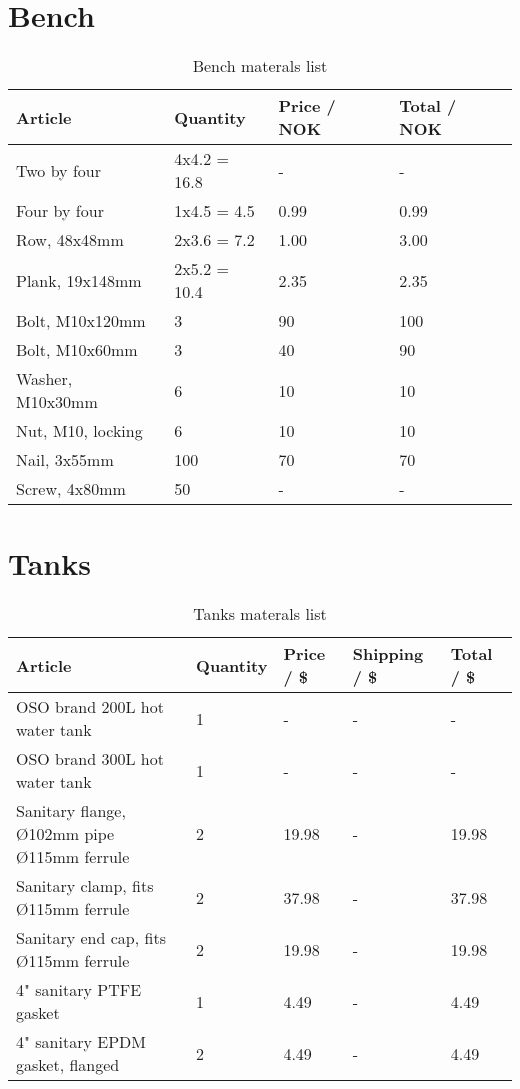 \documentclass[11pt,fleqn,openany]{book} %
\begin{document}
\section{Bench}

\begin{table}[h]
\centering
\begin{tabular}{l l l l}
\toprule
Article & Quantity & Price / NOK & Total / NOK\\
\midrule
Two by four & 4x4.2 = 16.8 & - & - \\
Four by four & 1x4.5 = 4.5 & 0.99 & 0.99 \\
Row, 48x48mm & 2x3.6 = 7.2 & 1.00 & 3.00 \\
Plank, 19x148mm & 2x5.2 = 10.4 & 2.35 & 2.35 \\
Bolt, M10x120mm & 3 & 90 & 100\\
Bolt, M10x60mm & 3 & 40 & 90\\
Washer, M10x30mm & 6 & 10 & 10\\
Nut, M10, locking & 6 & 10 & 10\\
Nail, 3x55mm & 100 & 70 & 70\\
Screw, 4x80mm & 50 & - & -\\
\bottomrule
\end{tabular}
\caption{Bench materals list}
\end{table}

\section{Tanks}

\begin{table}[h]
\centering
\begin{tabular}{l l l l l}
\toprule
Article & Quantity & Price / \$ & Shipping / \$ & Total / \$\\
\midrule
OSO brand 200L hot water tank & 1 & - & - & - \\
OSO brand 300L hot water tank & 1 & - & - & - \\
Sanitary flange, Ø102mm pipe Ø115mm ferrule & 2 & 19.98 & - & 19.98 \\
Sanitary clamp, fits Ø115mm ferrule & 2 & 37.98 & - & 37.98 \\
Sanitary end cap, fits Ø115mm ferrule & 2 & 19.98 & - & 19.98\\
4" sanitary PTFE gasket & 1 & 4.49 & - & 4.49 \\
4" sanitary EPDM gasket, flanged & 2 & 4.49 & - & 4.49 \\
\bottomrule
\end{tabular}
\caption{Tanks materals list}
\end{table}
\end{document}
